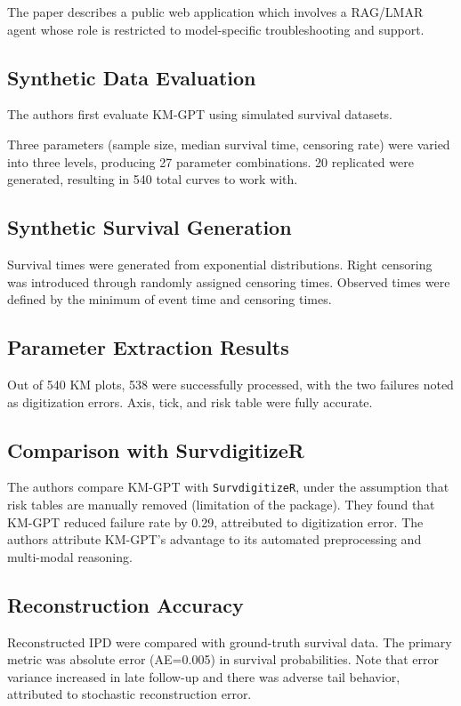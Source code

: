\documentclass[11pt]{article}
\begin{document}
The paper describes a public web application which involves a RAG/LMAR agent whose role is restricted to model-specific troubleshooting and support.

\subsection*{Synthetic Data Evaluation}

The authors first evaluate KM-GPT using simulated survival datasets.

Three parameters (sample size, median survival time, censoring rate) were varied into three levels, producing 27 parameter combinations. 20 replicated were generated, resulting in 540 total curves to work with. 

\subsection*{Synthetic Survival Generation}

Survival times were generated from exponential distributions. Right censoring was introduced through randomly assigned censoring times. Observed times were defined by the minimum of event time and censoring times.

\subsection*{Parameter Extraction Results}

Out of 540 KM plots, 538 were successfully processed, with the two failures noted as digitization errors. Axis, tick, and risk table were fully accurate. 

\subsection*{Comparison with SurvdigitizeR}

The authors compare KM-GPT with \texttt{SurvdigitizeR}, under the assumption that risk tables are manually removed (limitation of the package). They found that KM-GPT reduced failure rate by 0.29, attreibuted to digitization error. The authors attribute KM-GPT's advantage to its automated preprocessing and multi-modal reasoning.

\subsection*{Reconstruction Accuracy}

Reconstructed IPD were compared with ground-truth survival data. The primary metric was absolute error (AE=0.005) in survival probabilities. Note that error variance increased in late follow-up and there was adverse tail behavior, attributed to stochastic reconstruction error.
\end{document}
